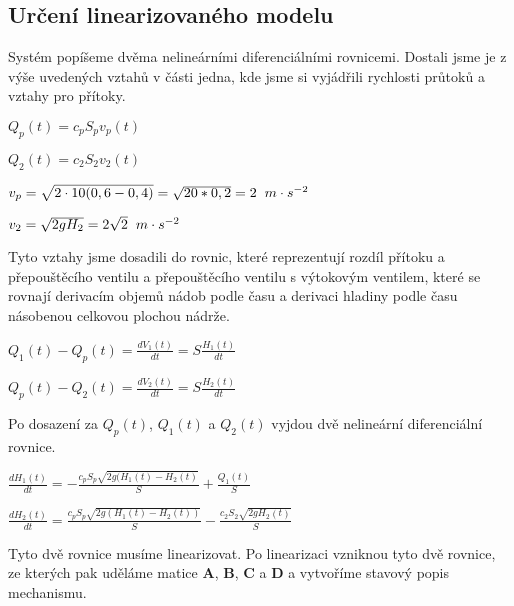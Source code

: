 \documentclass{article}
\begin{document}
		\subsection{Určení linearizovaného modelu}
			Systém popíšeme dvěma nelineárními diferenciálními rovnicemi. Dostali jsme je z výše uvedených vztahů v části jedna, kde jsme si vyjádřili rychlosti průtoků a vztahy pro přítoky.

			\begin{center}
			$Q_p (t)=c_pS_pv_p(t)$

			\bigskip

			$Q_2(t)=c_2S_2v_2(t)$

			\bigskip

			$v_p=\sqrt{2 \cdot 10(0,6-0,4)}=\sqrt{20*0,2}=2 \hspace{2mm} m \cdot s^{-2}$

			\bigskip

			$v_2=\sqrt{2gH_2}=2\sqrt{2} \hspace{2mm} m \cdot s^{-2}$
			\end{center}

			Tyto vztahy jsme dosadili do rovnic, které reprezentují rozdíl přítoku a přepouštěcího ventilu a přepouštěcího ventilu s výtokovým ventilem, které se rovnají derivacím objemů nádob podle času a derivaci hladiny podle času násobenou celkovou plochou nádrže.
			\begin{center}
			$Q_1(t)-Q_p (t)=\frac{dV_1(t)}{dt}=S\frac{H_1(t)}{dt}$

			\bigskip

			$Q_p(t)-Q_2(t)=\frac{dV_2(t)}{dt}=S\frac{H_2(t)}{dt}$
			\end{center}

			Po dosazení za $Q_p(t)$, $Q_1(t)$ a $Q_2(t)$ vyjdou dvě nelineární diferenciální rovnice.
			\begin{center}
			$\frac{dH_1(t)}{dt}=-\frac{c_pS_p\sqrt{2g(H_1(t)-H_2(t)}}{S}+\frac{Q_1(t)}{S}$

			\bigskip

			$\frac{dH_2(t)}{dt}=\frac{c_pS_p\sqrt{2g(H_1(t)-H_2(t))}}{S}-\frac{c_2S_2\sqrt{2gH_2(t)}}{S}$
			\end{center}

			Tyto dvě rovnice musíme linearizovat. Po linearizaci vzniknou tyto dvě rovnice, ze kterých pak uděláme matice \textbf{A}, \textbf{B}, \textbf{C} a \textbf{D} a vytvoříme stavový popis mechanismu.
\end{document}
